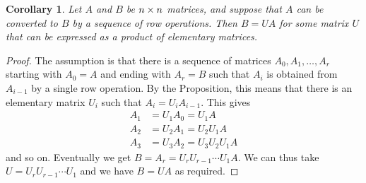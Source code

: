 \documentclass[reqno]{amsart}
\newtheorem{corollary}[theorem]{Corollary}
\theoremstyle{definition}
\begin{document}
\begin{corollary}\label{cor-ro-elem}
 Let $A$ and $B$ be $n\times n$ matrices, and suppose that $A$ can be
 converted to $B$ by a sequence of row operations.  Then $B=UA$ for
 some matrix $U$ that can be expressed as a product of elementary
 matrices.
\end{corollary}
\begin{proof}
 The assumption is that there is a sequence of matrices
 $A_0,A_1,\dotsc,A_r$ starting with $A_0=A$ and ending with $A_r=B$
 such that $A_i$ is obtained from $A_{i-1}$ by a single row
 operation.  By the Proposition, this means that there is an
 elementary matrix $U_i$ such that $A_i=U_iA_{i-1}$.  This gives
 \begin{align*}
  A_1 &= U_1A_0 = U_1A \\
  A_2 &= U_2A_1 = U_2U_1A \\
  A_3 &= U_3A_2 = U_3U_2U_1A
 \end{align*}
 and so on.  Eventually we get $B=A_r=U_rU_{r-1}\dotsb U_1A$.  We can
 thus take $U=U_rU_{r-1}\dotsb U_1$ and we have $B=UA$ as required.
\end{proof}
\end{document}
